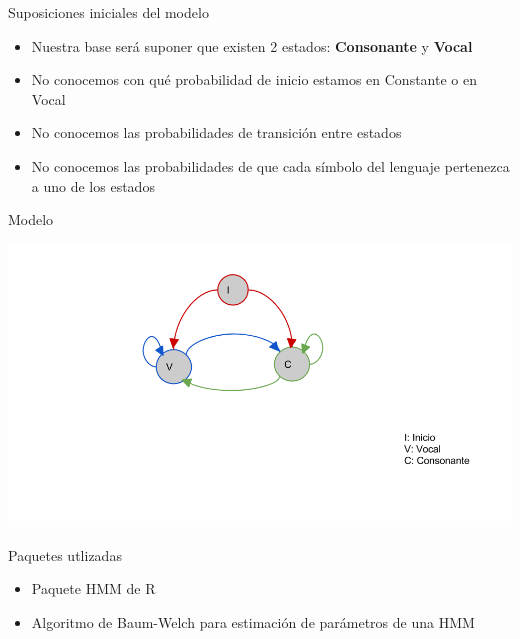 \documentclass[ignorenonframetext,]{beamer}
\begin{document}
\begin{frame}{Suposiciones iniciales del modelo}

\begin{itemize}
\item
  Nuestra base será suponer que existen 2 estados: \textbf{Consonante} y
  \textbf{Vocal}
\item
  No conocemos con qué probabilidad de inicio estamos en Constante o en
  Vocal
\item
  No conocemos las probabilidades de transición entre estados
\item
  No conocemos las probabilidades de que cada símbolo del lenguaje
  pertenezca a uno de los estados
\end{itemize}

\end{frame}

\begin{frame}{Modelo}

\includegraphics{../hmm/modelo_vocales.png}

\end{frame}

\begin{frame}{Paquetes utlizadas}

\begin{itemize}
\item
  Paquete HMM de R
\item
  Algoritmo de Baum-Welch para estimación de parámetros de una HMM
\end{itemize}

\end{frame}
\end{document}
